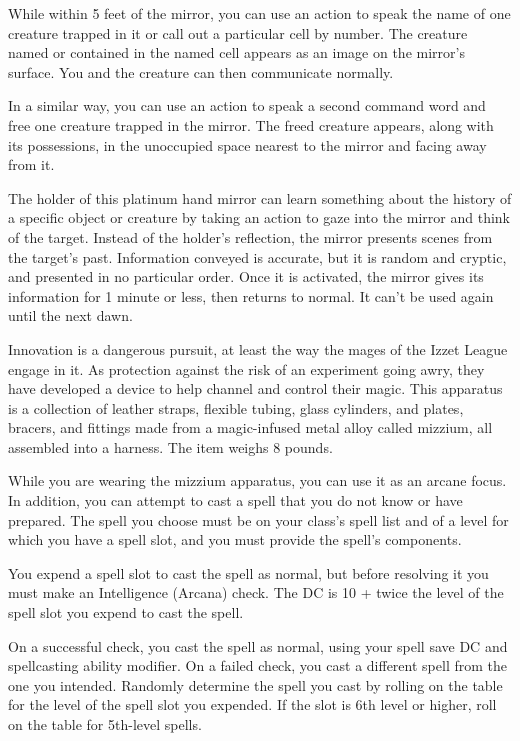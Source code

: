 \documentclass[10pt,a4paper,twoside,bg=print,twocolumn,openany,nodeprecatedcode]{dndbook}
\begin{document}
While within 5 feet of the mirror, you can use an action to speak the name of one creature trapped in it or call out a particular cell by number. The creature named or contained in the named cell appears as an image on the mirror's surface. You and the creature can then communicate normally.

In a similar way, you can use an action to speak a second command word and free one creature trapped in the mirror. The freed creature appears, along with its possessions, in the unoccupied space nearest to the mirror and facing away from it.

The holder of this platinum hand mirror can learn something about the history of a specific object or creature by taking an action to gaze into the mirror and think of the target. Instead of the holder's reflection, the mirror presents scenes from the target's past. Information conveyed is accurate, but it is random and cryptic, and presented in no particular order. Once it is activated, the mirror gives its information for 1 minute or less, then returns to normal. It can't be used again until the next dawn.

Innovation is a dangerous pursuit, at least the way the mages of the Izzet League engage in it. As protection against the risk of an experiment going awry, they have developed a device to help channel and control their magic. This apparatus is a collection of leather straps, flexible tubing, glass cylinders, and plates, bracers, and fittings made from a magic-infused metal alloy called mizzium, all assembled into a harness. The item weighs 8 pounds.

While you are wearing the mizzium apparatus, you can use it as an arcane focus. In addition, you can attempt to cast a spell that you do not know or have prepared. The spell you choose must be on your class's spell list and of a level for which you have a spell slot, and you must provide the spell's components.

You expend a spell slot to cast the spell as normal, but before resolving it you must make an Intelligence (Arcana) check. The DC is 10 + twice the level of the spell slot you expend to cast the spell.

On a successful check, you cast the spell as normal, using your spell save DC and spellcasting ability modifier. On a failed check, you cast a different spell from the one you intended. Randomly determine the spell you cast by rolling on the table for the level of the spell slot you expended. If the slot is 6th level or higher, roll on the table for 5th-level spells.
\end{document}
